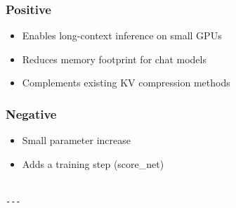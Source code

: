 \subsubsection{Positive}
\begin{itemize}
\item Enables long-context inference on small GPUs
\item Reduces memory footprint for chat models
\item Complements existing KV compression methods

\end{itemize}
\subsubsection{Negative}
\begin{itemize}
\item Small parameter increase
\item Adds a training step (score\_net)
\end{itemize}
\begin{lstlisting}

---
\end{lstlisting}